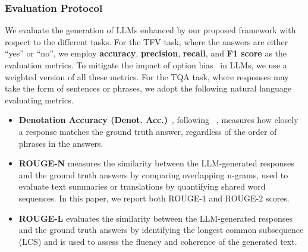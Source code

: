 {\subsubsection{Evaluation Protocol} We evaluate the generation of LLMs enhanced by our proposed \name framework with respect to the different tasks. For the TFV task, where the answers are either ``yes'' or ``no'', we employ \textbf{accuracy}, \textbf{precision}, \textbf{recall}, and \textbf{F1 score} as the evaluation metrics. To mitigate the impact of option bias~\cite{pezeshkpour-hruschka-2024-large,zheng2024large} in LLMs, we use a weighted version of all these metrics. For the TQA task, where responses may take the form of sentences or phrases, we adopt the following natural language evaluating metrics.
\begin{itemize}[leftmargin=*]
    \item \textbf{Denotation Accuracy (Denot. Acc.)}~\cite{deacc}, following ~\cite{jiang-etal-2023-structgpt,wang2024chainoftable}, measures how closely a response matches the ground truth answer, regardless of the order of phrases in the answers.
    \item \textbf{ROUGE-N} measures the similarity between the LLM-generated responses and the ground truth answers by comparing overlapping n-grams, used to evaluate text summaries or translations by quantifying shared word sequences. In this paper, we report both ROUGE-1 and ROUGE-2 scores.
    
    \item \textbf{ROUGE-L} evaluates the similarity between the LLM-generated responses and the ground truth answers by identifying the longest common subsequence (LCS) and is used to assess the fluency and coherence of the generated text.
    

\end{itemize}

}
